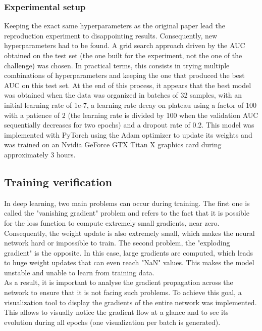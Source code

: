 \subsubsection{Experimental setup}
Keeping the exact same hyperparameters as the original paper lead the reproduction experiment to disappointing results. Consequently, new hyperparameters had to be found. A grid search approach driven by the AUC obtained on the test set (the one built for the experiment, not the one of the challenge) was chosen. In practical terms, this consists in trying multiple combinations of hyperparameters and keeping the one that produced the best AUC on this test set. At the end of this process, it appears that the best model was obtained when the data was organized in batches of 32 samples, with an initial learning rate of 1e-7, a learning rate decay on plateau using a factor of 100 with a patience of 2 (the learning rate is divided by 100 when the validation AUC sequentially decreases for two epochs) and a dropout rate of 0.2. This model was implemented with PyTorch using the Adam optimizer to update its weights and was trained on an Nvidia GeForce GTX Titan X graphics card during approximately 3 hours.\\

\subsection{Training verification}
In deep learning, two main problems can occur during training. The first one is called the "vanishing gradient" problem and refers to the fact that it is possible for the loss function to compute extremely small gradients, near zero. Consequently, the weight update is also extremely small, which makes the neural network hard or impossible to train. The second problem, the "exploding gradient" is the opposite. In this case, large gradients are computed, which leads to huge weight updates that can even reach "NaN" values. This makes the model unstable and unable to learn from training data.  \\
As a result, it is important to analyse the gradient propagation across the network to ensure that it is not facing such problems. To achieve this goal, a visualization tool to display the gradients of the entire network was implemented. This allows to visually notice the gradient flow at a glance and to see its evolution during all epochs (one visualization per batch is generated).


